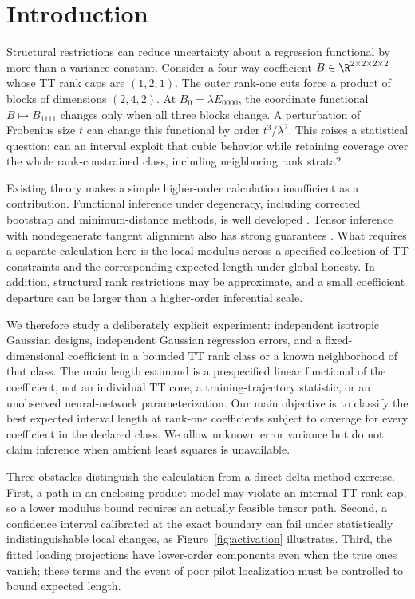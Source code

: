 \section{Introduction}
Structural restrictions can reduce uncertainty about a regression functional by more than a variance constant. Consider a four-way coefficient $B\in\R^{2\times2\times2\times2}$ whose TT rank caps are $(1,2,1)$. The outer rank-one cuts force a product of blocks of dimensions $(2,4,2)$. At $B_0=\lambda E_{0000}$, the coordinate functional $B\mapsto B_{1111}$ changes only when all three blocks change. A perturbation of Frobenius size $t$ can change this functional by order $t^3/\lambda^2$. This raises a statistical question: can an interval exploit that cubic behavior while retaining coverage over the whole rank-constrained class, including neighboring rank strata?

Existing theory makes a simple higher-order calculation insufficient as a contribution. Functional inference under degeneracy, including corrected bootstrap and minimum-distance methods, is well developed \citep{chenfang2019,bei2026}. Tensor inference with nondegenerate tangent alignment also has strong guarantees \citep{xu2025,maxia2024}. What requires a separate calculation here is the local modulus across a specified collection of TT constraints and the corresponding expected length under global honesty. In addition, structural rank restrictions may be approximate, and a small coefficient departure can be larger than a higher-order inferential scale.

We therefore study a deliberately explicit experiment: independent isotropic Gaussian designs, independent Gaussian regression errors, and a fixed-dimensional coefficient in a bounded TT rank class or a known neighborhood of that class. The main length estimand is a prespecified linear functional of the coefficient, not an individual TT core, a training-trajectory statistic, or an unobserved neural-network parameterization. Our main objective is to classify the best expected interval length at rank-one coefficients subject to coverage for every coefficient in the declared class. We allow unknown error variance but do not claim inference when ambient least squares is unavailable.

Three obstacles distinguish the calculation from a direct delta-method exercise. First, a path in an enclosing product model may violate an internal TT rank cap, so a lower modulus bound requires an actually feasible tensor path. Second, a confidence interval calibrated at the exact boundary can fail under statistically indistinguishable local changes, as Figure~\ref{fig:activation} illustrates. Third, the fitted loading projections have lower-order components even when the true ones vanish; these terms and the event of poor pilot localization must be controlled to bound expected length.

